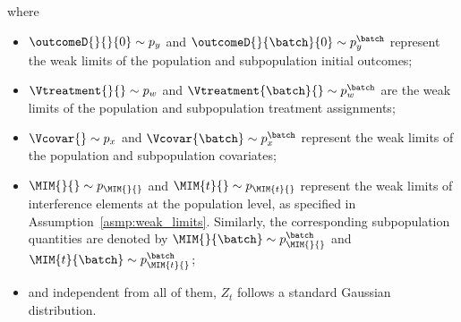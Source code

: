 % 
where 
% 
\begin{itemize}
    \item $\outcomeD{}{}{0} \sim p_y$ and $\outcomeD{}{\batch}{0} \sim p_y^\batch$ represent the weak limits of the population and subpopulation initial outcomes;

    \item $\Vtreatment{}{} \sim p_w$ and $\Vtreatment{\batch}{} \sim p_w^\batch$ are the weak limits of the population and subpopulation treatment assignments;

    \item $\Vcovar{} \sim p_x$ and $\Vcovar{\batch} \sim p_x^\batch$ represent the weak limits of the population and subpopulation covariates;

    \item $\MIM{}{} \sim p_{\MIM{}{}}$ and $\MIM{t}{} \sim p_{\MIM{t}{}}$ represent the weak limits of interference elements at the population level, as specified in Assumption~\ref{asmp:weak_limits}. Similarly, the corresponding subpopulation quantities are denoted by $\MIM{}{\batch} \sim p_{\MIM{}{}}^\batch$ and $\MIM{t}{\batch} \sim p_{\MIM{t}{}}^\batch$;

    \item and independent from all of them, $Z_t$ follows a standard Gaussian distribution.
\end{itemize}
% 

